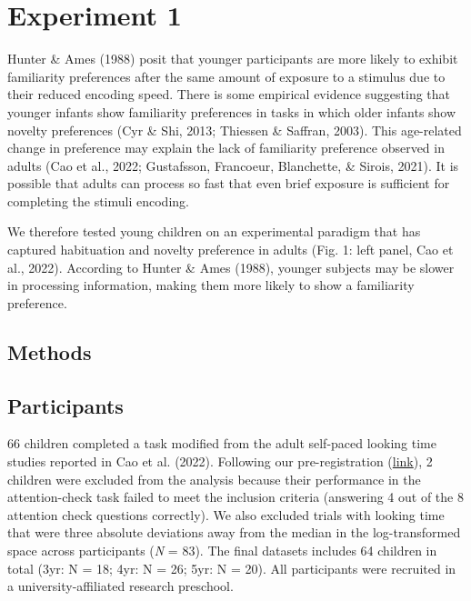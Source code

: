 \documentclass[10pt, letterpaper]{article}
\begin{document}
\hypertarget{experiment-1}{%
\section{Experiment 1}\label{experiment-1}}

Hunter \& Ames (1988) posit that younger participants are more likely to
exhibit familiarity preferences after the same amount of exposure to a
stimulus due to their reduced encoding speed. There is some empirical
evidence suggesting that younger infants show familiarity preferences in
tasks in which older infants show novelty preferences (Cyr \& Shi, 2013;
Thiessen \& Saffran, 2003). This age-related change in preference may
explain the lack of familiarity preference observed in adults (Cao et
al., 2022; Gustafsson, Francoeur, Blanchette, \& Sirois, 2021). It is
possible that adults can process so fast that even brief exposure is
sufficient for completing the stimuli encoding.

We therefore tested young children on an experimental paradigm that has
captured habituation and novelty preference in adults (Fig. 1: left
panel, Cao et al., 2022). According to Hunter \& Ames (1988), younger
subjects may be slower in processing information, making them more
likely to show a familiarity preference.

\hypertarget{methods}{%
\subsection{Methods}\label{methods}}

\hypertarget{participants}{%
\subsection{Participants}\label{participants}}

66 children completed a task modified from the adult self-paced looking
time studies reported in Cao et al. (2022). Following our
pre-registration
(\href{https://aspredicted.org/blind.php?x=5WQ_YQH}{link}), 2 children
were excluded from the analysis because their performance in the
attention-check task failed to meet the inclusion criteria (answering 4
out of the 8 attention check questions correctly). We also excluded
trials with looking time that were three absolute deviations away from
the median in the log-transformed space across participants (\emph{N} =
83). The final datasets includes 64 children in total (3yr: N = 18; 4yr:
N = 26; 5yr: N = 20). All participants were recruited in a
university-affiliated research preschool.
\end{document}
